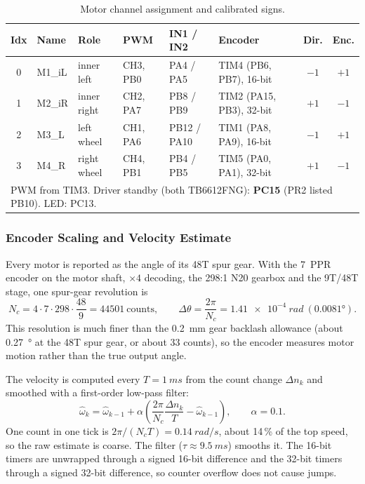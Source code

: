 \documentclass[12pt,a4paper]{article}
\begin{document}
\begin{table}[H]
\centering
\caption{Motor channel assignment and calibrated signs.}
\label{pr3:tab:pins}
\footnotesize
\begin{tabular}{c l l l l l c c}
\toprule
Idx & Name & Role & PWM & IN1 / IN2 & Encoder & Dir. & Enc. \\
\midrule
0 & M1\_iL & inner left  & CH3, PB0 & PA4 / PA5   & TIM4 (PB6, PB7), 16-bit  & $-1$ & $+1$ \\
1 & M2\_iR & inner right & CH2, PA7 & PB8 / PB9 & TIM2 (PA15, PB3), 32-bit & $+1$ & $-1$ \\
2 & M3\_L  & left wheel       & CH1, PA6 & PB12 / PA10 & TIM1 (PA8, PA9), 16-bit  & $-1$ & $+1$ \\
3 & M4\_R  & right wheel      & CH4, PB1 & PB4 / PB5   & TIM5 (PA0, PA1), 32-bit  & $+1$ & $-1$ \\
\midrule
\multicolumn{8}{l}{PWM from TIM3. Driver standby (both TB6612FNG): \textbf{PC15} (PR2 listed PB10). LED: PC13.} \\
\bottomrule
\end{tabular}
\end{table}

\subsubsection{Encoder Scaling and Velocity Estimate}

Every motor is reported as the angle of its 48T spur gear. With the 7~PPR encoder on the
motor shaft, $\times4$ decoding, the 298:1 N20 gearbox and the 9T/48T stage, one spur-gear
revolution is
\begin{equation}
  N_c = 4 \cdot 7 \cdot 298 \cdot \frac{48}{9} = \num{44501}\ \text{counts},
  \qquad \Delta\theta = \frac{2\pi}{N_c} = \SI{1.41e-4}{rad}\ (\ang{0.0081}).
  \label{pr3:eq:cpr}
\end{equation}
This resolution is much finer than the \SI{0.2}{mm} gear backlash allowance (about
\SI{0.27}{\degree} at the 48T spur gear, or about 33 counts), so the encoder measures motor
motion rather than the true output angle.

The velocity is computed every $T=\SI{1}{ms}$ from the count change $\Delta n_k$ and smoothed
with a first-order low-pass filter:
\begin{equation}
  \hat\omega_k = \hat\omega_{k-1} + \alpha\left(\frac{2\pi}{N_c}\frac{\Delta n_k}{T}-\hat\omega_{k-1}\right),
  \qquad \alpha = 0.1 .
\end{equation}
One count in one tick is $2\pi/(N_c T)=\SI{0.14}{rad/s}$, about 14\,\% of the top speed, so the
raw estimate is coarse. The filter ($\tau\approx\SI{9.5}{ms}$) smooths it. The 16-bit
timers are unwrapped through a signed 16-bit difference and the 32-bit timers through a
signed 32-bit difference, so counter overflow does not cause jumps.
\end{document}
